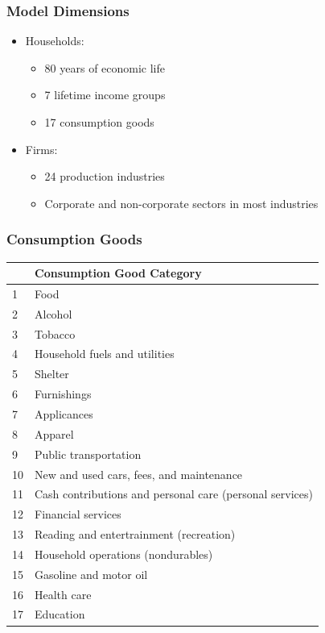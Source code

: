 \documentclass{beamer}
\begin{document}
   \begin{frame}
    \frametitle{Model Dimensions}
    \begin{itemize}
      \item Households:
      		\begin{itemize}
		\item 80 years of economic life
		\item 7 lifetime income groups
		\item 17 consumption goods
		\end{itemize}
      \item Firms:
      	\begin{itemize}
	\item 24 production industries
	\item Corporate and non-corporate sectors in most industries
	\end{itemize}
    \end{itemize}
  \end{frame}

   \begin{frame}
    \frametitle{Consumption Goods}
\begin{table}[htbp]
  \centering
  \footnotesize
    \begin{tabular}{ll}
    \hline
    \hline
          & Consumption Good Category \\
    \hline
    1     & Food  \\
    2     & Alcohol \\
    3     & Tobacco \\
    4     & Household fuels and utilities \\
    5     & Shelter \\
    6     & Furnishings \\
    7     & Applicances \\
    8     & Apparel \\
    9     & Public transportation \\
    10    & New and used cars, fees, and maintenance \\
    11    & Cash contributions and personal care (personal services) \\
    12    & Financial services \\
    13    & Reading and entertrainment (recreation) \\
    14    & Household operations (nondurables) \\
    15    & Gasoline and motor oil \\
    16    & Health care \\
    17    & Education \\
    \hline
    \hline
    \end{tabular}%
  \label{tab:addlabel}%
\end{table}%
  \end{frame}
\end{document}

